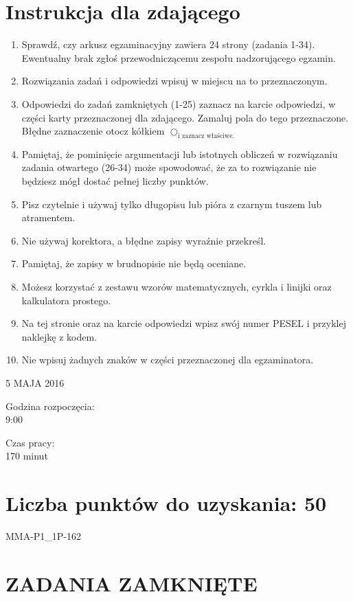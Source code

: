 \documentclass[10pt]{article}
\begin{document}
\section*{Instrukcja dla zdającego}
\begin{enumerate}
  \item Sprawdź, czy arkusz egzaminacyjny zawiera 24 strony (zadania 1-34). Ewentualny brak zgłoś przewodniczącemu zespołu nadzorującego egzamin.
  \item Rozwiązania zadań i odpowiedzi wpisuj w miejscu na to przeznaczonym.
  \item Odpowiedzi do zadań zamkniętych (1-25) zaznacz na karcie odpowiedzi, w części karty przeznaczonej dla zdającego. Zamaluj pola do tego przeznaczone. Błędne zaznaczenie otocz kółkiem \(\bigcirc_{\text {i zaznacz właściwe. }}\)
  \item Pamiętaj, że pominięcie argumentacji lub istotnych obliczeń w rozwiązaniu zadania otwartego (26-34) może spowodować, że za to rozwiązanie nie będziesz mógł dostać pełnej liczby punktów.
  \item Pisz czytelnie i używaj tylko długopisu lub pióra z czarnym tuszem lub atramentem.
  \item Nie używaj korektora, a błędne zapisy wyraźnie przekreśl.
  \item Pamiętaj, że zapisy w brudnopisie nie będą oceniane.
  \item Możesz korzystać z zestawu wzorów matematycznych, cyrkla i linijki oraz kalkulatora prostego.
  \item Na tej stronie oraz na karcie odpowiedzi wpisz swój numer PESEL i przyklej naklejkę z kodem.
  \item Nie wpisuj żadnych znaków w części przeznaczonej dla egzaminatora.
\end{enumerate}

5 MAJA 2016

Godzina rozpoczęcia:\\
9:00

Czas pracy:\\
170 minut

\section*{Liczba punktów do uzyskania: 50}
MMA-P1\_1P-162

\section*{ZADANIA ZAMKNIĘTE}
\end{document}
